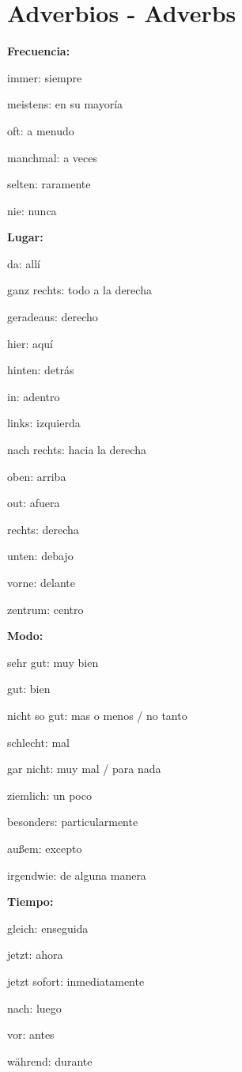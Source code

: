 \section{Adverbios - Adverbs}
\textbf{Frecuencia:}
\begin{myitemize}
\item immer: siempre
\item meistens: en su mayoría
\item oft: a menudo
\item manchmal: a veces
\item selten: raramente
\item nie: nunca
\end{myitemize}

\textbf{Lugar:}
\begin{myitemize}
\item da: allí
\item ganz rechts: todo a la derecha
\item geradeaus: derecho
\item hier: aquí
\item hinten: detrás
\item in: adentro
\item links: izquierda
\item nach rechts: hacia la derecha
\item oben: arriba
\item out: afuera
\item rechts: derecha
\item unten: debajo
\item vorne: delante
\item zentrum: centro
\end{myitemize}

\textbf{Modo:}
\begin{myitemize}
\item sehr gut: muy bien
\item gut: bien
\item nicht so gut: mas o menos / no tanto
\item schlecht: mal
\item gar nicht: muy mal / para nada
\item ziemlich: un poco
\item besonders: particularmente
\item außem: excepto
\item irgendwie: de alguna manera
\end{myitemize}

\textbf{Tiempo:}
\begin{myitemize}
\item gleich: enseguida
\item jetzt: ahora
\item jetzt sofort: inmediatamente
\item nach: luego
\item vor: antes
\item während: durante
\end{myitemize}

